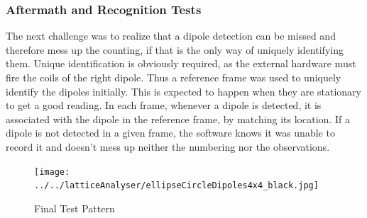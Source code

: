 		\subsubsection{Aftermath and Recognition Tests}
			The next challenge was to realize that a dipole detection can be missed and therefore mess up the counting, if that is the only way of uniquely identifying them. Unique identification is obviously required, as the external hardware must fire the coils of the right dipole. Thus a reference frame was used to uniquely identify the dipoles initially. This is expected to happen when they are stationary to get a good reading. In each frame, whenever a dipole is detected, it is associated with the dipole in the reference frame, by matching its location. If a dipole is not detected in a given frame, the software knows it was unable to record it and doesn't mess up neither the numbering nor the observations.
			\par

			\begin{figure}[bth]
				\begin{center}
					\texttt{[image: ../../latticeAnalyser/ellipseCircleDipoles4x4\_black.jpg]}
				\end{center}
			\caption[Final Test Pattern]{Final Test Pattern}
			\label{testPattern}
			\end{figure}

